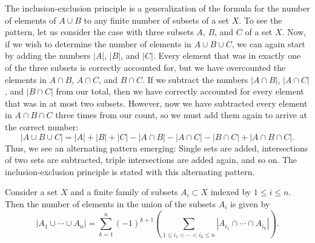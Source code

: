 The inclusion-exclusion principle is a generalization of the formula for the number of elements of $A\cup B$ to any finite number of subsets of a set $X$. To see the pattern, let us consider the case with three subsets $A$, $B$, and $C$ of a set $X$. Now, if we wish to determine the number of elements in $A\cup B\cup C$, we can again start by adding the numbers $|A|$, $|B|$, and $|C|$. Every element that was in exactly one of the three subsets is correctly accounted for, but we have overcounted the elements in $A\cap B$, $A\cap C$, and $B\cap C$. If we subtract the numbers $|A\cap B|$, $|A\cap C|$, and $|B\cap C|$ from our total, then we have correctly accounted for every element that was in at most two subsets. However, now we have subtracted every element in $A\cap B\cap C$ three times from our count, so we must add them again to arrive at the correct number:
\begin{equation*}
  |A\cup B\cup C|=|A|+|B|+|C|-|A\cap B|-|A\cap C|-|B\cap C|+|A\cap B \cap C|.
\end{equation*}
Thus, we see an alternating pattern emerging: Single sets are added, intersections of two sets are subtracted, triple intersections are added again, and so on. The inclusion-exclusion principle is stated with this alternating pattern.

\begin{theorem}
  Consider a set $X$ and a finite family of subsets $A_i\subset X$ indexed by $1\leq i\leq n$. Then the number of elements in the union of the subsets $A_i$ is given by
  \begin{equation*}
    |A_1\cup\cdots\cup A_n|=\sum_{k=1}^n (-1)^{k+1}\left(\sum_{1\leq i_1<\cdots<i_k\leq n}|A_{i_1}\cap\cdots\cap A_{i_k}|\right).
  \end{equation*}
\end{theorem}

